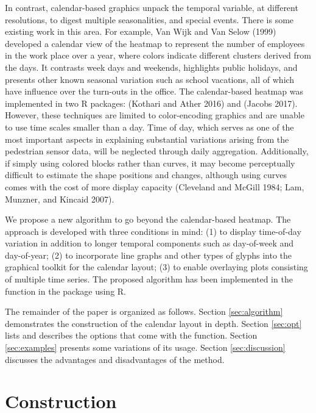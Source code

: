 In contrast, calendar-based graphics unpack the temporal variable, at
different resolutions, to digest multiple seasonalities, and special
events. There is some existing work in this area. For example, Van Wijk
and Van Selow (1999) developed a calendar view of the heatmap to
represent the number of employees in the work place over a year, where
colors indicate different clusters derived from the days. It contrasts
week days and weekends, highlights public holidays, and presents other
known seasonal variation such as school vacations, all of which have
influence over the turn-outs in the office. The calendar-based heatmap
was implemented in two R packages:  (Kothari and Ather
2016) and  (Jacobs 2017). However, these techniques are
limited to color-encoding graphics and are unable to use time scales
smaller than a day. Time of day, which serves as one of the most
important aspects in explaining substantial variations arising from the
pedestrian sensor data, will be neglected through daily aggregation.
Additionally, if simply using colored blocks rather than curves, it may
become perceptually difficult to estimate the shape positions and
changes, although using curves comes with the cost of more display
capacity (Cleveland and McGill 1984; Lam, Munzner, and Kincaid 2007).

We propose a new algorithm to go beyond the calendar-based heatmap. The
approach is developed with three conditions in mind: (1) to display
time-of-day variation in addition to longer temporal components such as
day-of-week and day-of-year; (2) to incorporate line graphs and other
types of glyphs into the graphical toolkit for the calendar layout; (3)
to enable overlaying plots consisting of multiple time series. The
proposed algorithm has been implemented in the 
function in the  package using R.

The remainder of the paper is organized as follows. Section
\ref{sec:algorithm} demonstrates the construction of the calendar layout
in depth. Section \ref{sec:opt} lists and describes the options that
come with the  function. Section
\ref{sec:examples} presents some variations of its usage. Section
\ref{sec:discussion} discusses the advantages and disadvantages of the
method.

\hypertarget{construction}{%
\section{Construction}\label{construction}}

